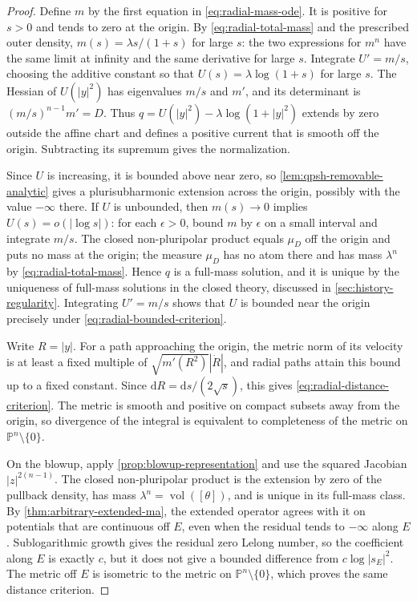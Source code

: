 \begin{proof}
Define $m$ by the first equation in \eqref{eq:radial-mass-ode}. It is positive for $s>0$ and tends to zero at the origin. By \eqref{eq:radial-total-mass} and the prescribed outer density, $m(s)=\lambda s/(1+s)$ for large $s$: the two expressions for $m^n$ have the same limit at infinity and the same derivative for large $s$. Integrate $U'=m/s$, choosing the additive constant so that $U(s)=\lambda\log(1+s)$ for large $s$. The Hessian of $U(|y|^2)$ has eigenvalues $m/s$ and $m'$, and its determinant is $(m/s)^{n-1}m'=D$. Thus $q=U(|y|^2)-\lambda\log(1+|y|^2)$ extends by zero outside the affine chart and defines a positive current that is smooth off the origin. Subtracting its supremum gives the normalization.

Since $U$ is increasing, it is bounded above near zero, so \cref{lem:qpsh-removable-analytic} gives a plurisubharmonic extension across the origin, possibly with the value $-\infty$ there. If $U$ is unbounded, then $m(s)\to0$ implies $U(s)=o(|\log s|)$: for each $\epsilon>0$, bound $m$ by $\epsilon$ on a small interval and integrate $m/s$. The closed non-pluripolar product equals $\mu_D$ off the origin and puts no mass at the origin; the measure $\mu_D$ has no atom there and has mass $\lambda^n$ by \eqref{eq:radial-total-mass}. Hence $q$ is a full-mass solution, and it is unique by the uniqueness of full-mass solutions in the closed theory, discussed in \cref{sec:history-regularity}. Integrating $U'=m/s$ shows that $U$ is bounded near the origin precisely under \eqref{eq:radial-bounded-criterion}.

Write $R=|y|$. For a path approaching the origin, the metric norm of its velocity is at least a fixed multiple of $\sqrt{m'(R^2)}|\dot R|$, and radial paths attain this bound up to a fixed constant. Since $\mathrm{d} R=\mathrm{d} s/(2\sqrt{s})$, this gives \eqref{eq:radial-distance-criterion}. The metric is smooth and positive on compact subsets away from the origin, so divergence of the integral is equivalent to completeness of the metric on $\mathbb P^n\setminus\{0\}$.

On the blowup, apply \cref{prop:blowup-representation} and use the squared Jacobian $|z|^{2(n-1)}$. The closed non-pluripolar product is the extension by zero of the pullback density, has mass $\lambda^n=\operatorname{vol}([\theta])$, and is unique in its full-mass class. By \cref{thm:arbitrary-extended-ma}, the extended operator agrees with it on potentials that are continuous off $E$, even when the residual tends to $-\infty$ along $E$. Sublogarithmic growth gives the residual zero Lelong number, so the coefficient along $E$ is exactly $c$, but it does not give a bounded difference from $c\log|s_E|^2$. The metric off $E$ is isometric to the metric on $\mathbb P^n\setminus\{0\}$, which proves the same distance criterion.


\end{proof}

